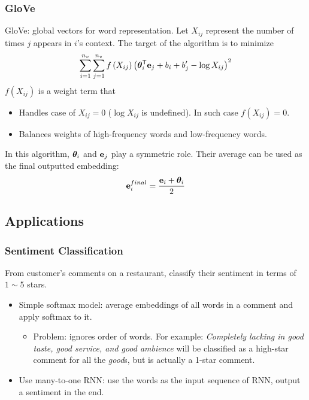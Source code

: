 \subsubsection{GloVe}
GloVe: global vectors for word representation. Let $X_{ij}$ represent the number of times $j$ appears in $i$'s context.
The target of the algorithm is to minimize 
\begin{align*}
  \displaystyle\sum_{i=1}^{n_v}\displaystyle\sum_{j=1}^{n_v}f\left(X_{ij}\right)\left(\mathbf{\boldsymbol{\theta}}_{i}^{\mathsf{T}}\mathbf{e}_{j}+b_i+b'_j-\log X_{ij}\right)^2
\end{align*}
$f\left(X_{ij}\right)$ is a weight term that
\begin{itemize}
  \item Handles case of $X_{ij}=0$ ($\log X_{ij}$ is undefined). In such case $f\left(X_{ij}\right)=0$.
  \item Balances weights of high-frequency words and low-frequency words.
\end{itemize}
In this algorithm, $\mathbf{\boldsymbol{\theta}}_{i}$ and $\mathbf{e}_{j}$ play a symmetric role. Their average can be used as the final outputted embedding:
\begin{align*}
  \mathbf{e}_{i}^{final}=\frac{\mathbf{e}_{i}+\mathbf{\boldsymbol{\theta}}_{i}}{2}
\end{align*}
\subsection{Applications}
\subsubsection{Sentiment Classification}
From customer's comments on a restaurant, classify their sentiment in terms of $1\sim 5$ stars.
\begin{itemize}
  \item Simple softmax model: average embeddings of all words in a comment and apply softmax to it. 
  \begin{itemize}
  \item Problem: ignores order of words. For example: \textit{Completely lacking in good taste, good service, and good ambience} will be classified as a high-star comment for all the \textit{good}s, but is actually a 1-star comment. 
  \end{itemize}
  \item Use many-to-one RNN: use the words as the input sequence of RNN, output a sentiment in the end.
\end{itemize}
